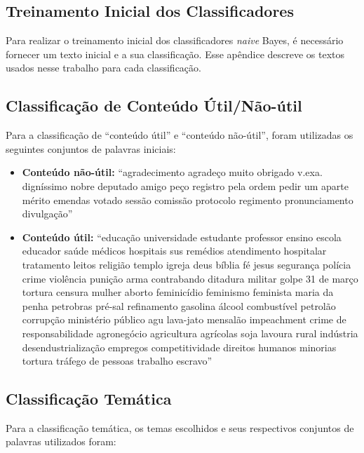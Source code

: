 \begin{apendicesenv}
\chapter{Treinamento Inicial dos Classificadores}
\label{conjunto-palavras}

Para realizar o treinamento inicial dos classificadores \textit{naive} Bayes, é necessário fornecer um texto inicial e a sua classificação. Esse apêndice descreve os textos usados nesse trabalho para cada classificação.

\section{Classificação de Conteúdo Útil/Não-útil}

Para a classificação de ``conteúdo útil'' e ``conteúdo não-útil'', foram utilizadas os seguintes conjuntos de palavras iniciais:

\begin{itemize}
    \item \textbf{Conteúdo não-útil:} ``agradecimento agradeço muito obrigado v.exa. digníssimo nobre deputado amigo peço registro pela ordem pedir um aparte mérito emendas votado sessão comissão protocolo regimento pronunciamento divulgação''
    \item \textbf{Conteúdo útil:} ``educação universidade estudante professor ensino escola educador saúde médicos hospitais sus remédios atendimento hospitalar tratamento leitos religião templo igreja deus bíblia fé jesus segurança polícia crime violência punição arma contrabando ditadura militar golpe 31 de março tortura censura mulher aborto feminicídio feminismo feminista maria da penha petrobras pré-sal refinamento gasolina álcool combustível petrolão corrupção ministério público agu lava-jato mensalão impeachment crime de responsabilidade agronegócio agricultura agrícolas soja lavoura rural indústria desendustrialização empregos competitividade direitos humanos minorias tortura tráfego de pessoas trabalho escravo''
\end{itemize}

\section{Classificação Temática}

Para a classificação temática, os temas escolhidos e seus respectivos conjuntos de palavras utilizados foram:


\end{apendicesenv}
